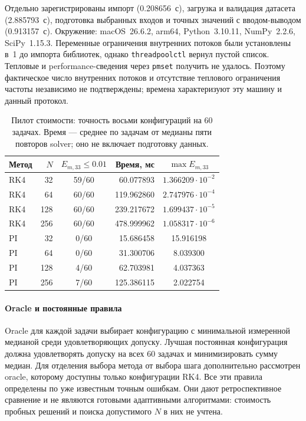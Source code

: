\documentclass[14pt,a4paper]{extarticle}
\DeclareRobustCommand{\code}[1]{\texttt{\let\savedunderscore\_\def\_{\savedunderscore\allowbreak}#1}}
\begin{document}
Отдельно зарегистрированы импорт (0.208656~с), загрузка и валидация
датасета (2.885793~с), подготовка выбранных входов и точных значений
с вводом-выводом (0.913157~с). Окружение: macOS~26.6.2, arm64,
Python~3.10.11, NumPy~2.2.6, SciPy~1.15.3. Переменные ограничения
внутренних потоков были установлены в~1 до импорта библиотек, однако
\code{threadpoolctl} вернул пустой список. Тепловые и performance-сведения
через \code{pmset} получить не удалось. Поэтому фактическое число
внутренних потоков и отсутствие теплового ограничения частоты независимо
не подтверждены; времена характеризуют эту машину и данный протокол.

\begin{table}[!htbp]
\centering
\caption{Пилот стоимости: точность восьми конфигураций на 60 задачах.
Время --- среднее по задачам от медианы пяти повторов solver;
оно не включает подготовку данных.}
\label{tab:costpilot-configurations}
\small
\begin{tabular}{lrcrc}
\toprule
Метод & $N$ & $E_{m,33}\le0.01$ & Время, мс & $\max E_{m,33}$\\
\midrule
RK4 & 32  & 59/60 & 60.077893  & $1.366209\cdot10^{-2}$\\
RK4 & 64  & 60/60 & 119.962860 & $2.747976\cdot10^{-4}$\\
RK4 & 128 & 60/60 & 239.217672 & $1.699437\cdot10^{-5}$\\
RK4 & 256 & 60/60 & 478.999962 & $1.058317\cdot10^{-6}$\\
PI  & 32  & 0/60  & 15.686458  & 15.916198\\
PI  & 64  & 0/60  & 31.300706  & 8.039300\\
PI  & 128 & 4/60  & 62.703981  & 4.037363\\
PI  & 256 & 7/60  & 125.386115 & 2.022754\\
\bottomrule
\end{tabular}
\end{table}

\paragraph{Oracle и постоянные правила\\}
Oracle для каждой задачи выбирает конфигурацию с минимальной измеренной
медианой среди удовлетворяющих допуску. Лучшая постоянная конфигурация
должна удовлетворять допуску на всех 60 задачах и минимизировать сумму
медиан. Для отделения выбора метода от выбора шага дополнительно
рассмотрен oracle, которому доступны только конфигурации RK4.
Все эти правила определены по уже известным точным ошибкам. Они дают
ретроспективное сравнение и не являются готовыми адаптивными алгоритмами:
стоимость пробных решений и поиска допустимого $N$ в них не учтена.
\end{document}
